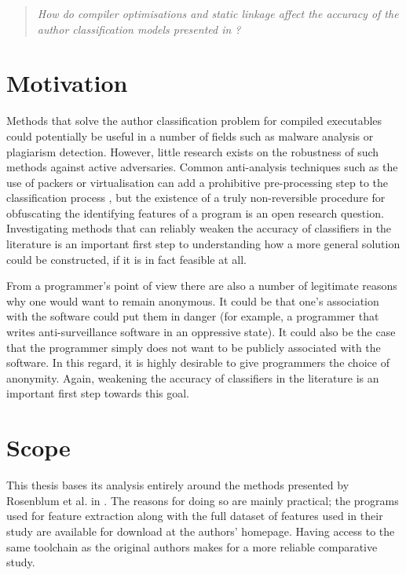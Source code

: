 \documentclass[a4paper,11pt]{kth-mag}
\newenvironment{italicquotes}
{\begin{quote}\itshape}
{\end{quote}}
\begin{document}
\begin{italicquotes}
How do compiler optimisations and static linkage affect the accuracy of the
author classification models presented in \parencite{rosenblum2011wrote}?
\end{italicquotes}

\section{Motivation}
Methods that solve the author classification problem for compiled executables
could potentially be useful in a number of fields such as malware analysis or
plagiarism detection. However, little research exists on the robustness of such
methods against active adversaries. Common anti-analysis techniques such as the
use of packers or virtualisation can add a prohibitive pre-processing step to
the classification process \parencite{caliskan2015coding}, but the existence of
a truly non-reversible procedure for obfuscating the identifying features of a
program is an open research question. Investigating methods that can reliably
weaken the accuracy of classifiers in the literature is an important first
step to understanding how a more general solution could be constructed, if it
is in fact feasible at all.

From a programmer's point of view there are also a number of legitimate reasons
why one would want to remain anonymous. It could be that one's association with
the software could put them in danger (for example, a programmer that writes
anti-surveillance software in an oppressive state). It could also be the case
that the programmer simply does not want to be publicly associated with the
software. In this regard, it is highly desirable to give programmers the choice
of anonymity. Again, weakening the accuracy of classifiers in the literature is
an important first step towards this goal.

\section{Scope}
\label{sec:scope}
This thesis bases its analysis entirely around the methods presented by
Rosenblum et al. in \parencite{rosenblum2011wrote}. The reasons for doing so
are mainly practical; the programs used for feature extraction along with the
full dataset of features used in their study are available for download at the
authors' homepage. Having access to the same toolchain as the original authors
makes for a more reliable comparative study.
\end{document}
